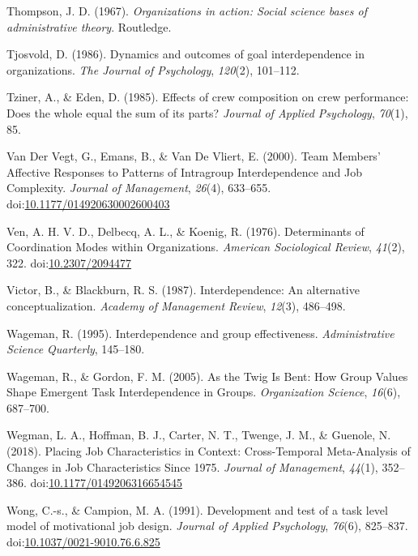 \documentclass[english,,man]{apa6}
\theoremstyle{definition}
\theoremstyle{definition}
\theoremstyle{definition}
\theoremstyle{remark}
\begin{document}
\leavevmode\hypertarget{ref-thompson2017organizations}{}%
Thompson, J. D. (1967). \emph{Organizations in action: Social science
bases of administrative theory}. Routledge.

\leavevmode\hypertarget{ref-tjosvold_dynamics_1986}{}%
Tjosvold, D. (1986). Dynamics and outcomes of goal interdependence in
organizations. \emph{The Journal of Psychology}, \emph{120}(2),
101--112.

\leavevmode\hypertarget{ref-tziner1985effects}{}%
Tziner, A., \& Eden, D. (1985). Effects of crew composition on crew
performance: Does the whole equal the sum of its parts? \emph{Journal of
Applied Psychology}, \emph{70}(1), 85.

\leavevmode\hypertarget{ref-van_der_vegt_team_2000}{}%
Van Der Vegt, G., Emans, B., \& Van De Vliert, E. (2000). Team Members'
Affective Responses to Patterns of Intragroup Interdependence and Job
Complexity. \emph{Journal of Management}, \emph{26}(4), 633--655.
doi:\href{https://doi.org/10.1177/014920630002600403}{10.1177/014920630002600403}

\leavevmode\hypertarget{ref-ven_determinants_1976}{}%
Ven, A. H. V. D., Delbecq, A. L., \& Koenig, R. (1976). Determinants of
Coordination Modes within Organizations. \emph{American Sociological
Review}, \emph{41}(2), 322.
doi:\href{https://doi.org/10.2307/2094477}{10.2307/2094477}

\leavevmode\hypertarget{ref-victor_interdependence_1987}{}%
Victor, B., \& Blackburn, R. S. (1987). Interdependence: An alternative
conceptualization. \emph{Academy of Management Review}, \emph{12}(3),
486--498.

\leavevmode\hypertarget{ref-wageman_interdependence_1995}{}%
Wageman, R. (1995). Interdependence and group effectiveness.
\emph{Administrative Science Quarterly}, 145--180.

\leavevmode\hypertarget{ref-wageman_as_2005}{}%
Wageman, R., \& Gordon, F. M. (2005). As the Twig Is Bent: How Group
Values Shape Emergent Task Interdependence in Groups. \emph{Organization
Science}, \emph{16}(6), 687--700.

\leavevmode\hypertarget{ref-wegman_placing_2018}{}%
Wegman, L. A., Hoffman, B. J., Carter, N. T., Twenge, J. M., \& Guenole,
N. (2018). Placing Job Characteristics in Context: Cross-Temporal
Meta-Analysis of Changes in Job Characteristics Since 1975.
\emph{Journal of Management}, \emph{44}(1), 352--386.
doi:\href{https://doi.org/10.1177/0149206316654545}{10.1177/0149206316654545}

\leavevmode\hypertarget{ref-wong_development_1991}{}%
Wong, C.-s., \& Campion, M. A. (1991). Development and test of a task
level model of motivational job design. \emph{Journal of Applied
Psychology}, \emph{76}(6), 825--837.
doi:\href{https://doi.org/10.1037/0021-9010.76.6.825}{10.1037/0021-9010.76.6.825}
\end{document}
